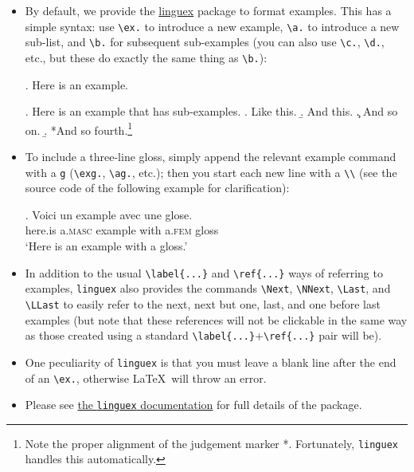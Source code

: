 \documentclass[linguex]{lfg-proc}
\begin{document}
\begin{itemize}
  \item By default, we provide the \href{https://ctan.org/pkg/linguex}{linguex}
  package to format examples. This has a simple syntax: use \verb=\ex.= to
  introduce a new example, \verb=\a.= to introduce a new sub-list, and
  \verb=\b.= for subsequent sub-examples (you can also use \verb=\c.=,
  \verb=\d.=, etc., but these do exactly the same thing as \verb=\b.=):

        \ex. Here is an example.

        \ex. Here is an example that has sub-examples.%
        \a. Like this.%
        \b. And this.%
        \c. And so on.%
        \b. *And so fourth.\footnote{Note the proper alignment of the judgement
        marker *. Fortunately, \texttt{linguex} handles this automatically.}

  \item To include a three-line gloss, simply append the relevant example
        command with a \verb=g= (\verb=\exg.=, \verb=\ag.=, etc.); then you
        start each new line with a \verb=\\= (see the source code of the
        following example for clarification):

        \exg.%
        Voici un example avec une glose.\\
        here.is a.\textsc{masc} example with a.\textsc{fem} gloss\\
        `Here is an example with a gloss.' 

  \item In addition to the usual \verb=\label{...}= and \verb=\ref{...}= ways of
        referring to examples, \verb=linguex= also provides the commands
        \verb=\Next=, \verb=\NNext=, \verb=\Last=, and \verb=\LLast= to easily
        refer to the next, next but one, last, and one before last examples (but
        note that these references will not be clickable in the same way as
        those created using a standard \verb=\label{...}=+\verb=\ref{...}= pair
        will be).

  \item One peculiarity of \verb=linguex= is that you must leave a blank line
        after the end of an \verb=\ex.=, otherwise \LaTeX\ will throw an error.

  \item Please see
        \href{https://ctan.uib.no/macros/latex/contrib/linguex/doc/linguex-doc.pdf}{the
        \texttt{linguex} documentation} for full details of the package.


\end{itemize}
\end{document}
